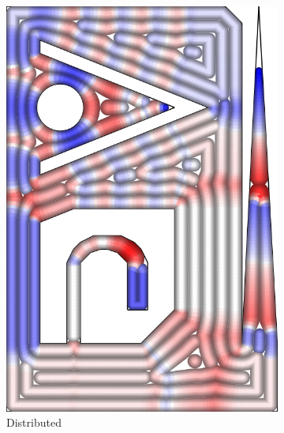 \begin{figure}
\begin{subfigure}{\figwidth}
\includegraphics[height=\figheight]{sources-validation-gMAT-example-TEST-Distributed-widths.png}
\caption{Distributed}\label{TEST_Distributed_accuracy}
\end{subfigure}
\begin{subfigure}{\figwidth}\centering

\end{subfigure}
\end{figure}
